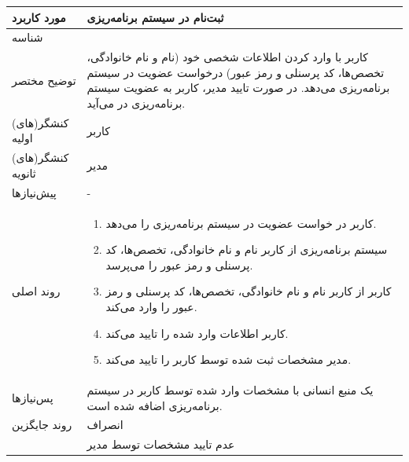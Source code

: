 \begin{table}[H]
	\centering
	\begin{tabular}{|p{3cm}|p{10cm}|}
		\hline
		مورد کاربرد & ثبت‌نام در سیستم برنامه‌ریزی  \\
		\hline
		شناسه & 
		\stepcounter{usecase_ID}
		\arabic{usecase_ID} \\
		\hline
		توضیح مختصر & کاربر با وارد کردن اطلاعات شخصی خود (نام و نام خانوادگی، تخصص‌ها، کد پرسنلی و رمز عبور) درخواست عضویت در سیستم برنامه‌ریزی می‌دهد. در صورت تایید مدیر، کاربر به عضویت سیستم برنامه‌ریزی در می‌آید. \\
		\hline
		کنشگر(های) اولیه & کاربر \\
		\hline
		کنشگر(های) ثانویه & مدیر \\
		\hline
		پیش‌نیازها & - \\
		\hline
		
		روند اصلی &
		\begin{enumerate}[topsep=0cm,leftmargin=0.5cm]
			\item کاربر در خواست عضویت در سیستم برنامه‌ریزی را می‌دهد.
			\item سیستم برنامه‌ریزی از کاربر نام و نام خانوادگی، تخصص‌ها، کد پرسنلی و رمز عبور را می‌پرسد.
			\item کاربر از کاربر نام و نام خانوادگی، تخصص‌ها، کد پرسنلی و رمز عبور را وارد می‌کند.
			\item کاربر اطلاعات وارد شده را تایید می‌کند.
			\item مدیر مشخصات ثبت شده توسط کاربر را تایید می‌کند.
		\end{enumerate} \\
		
		\hline
		پس‌نیازها & یک منبع انسانی با مشخصات وارد شده توسط کاربر در سیستم برنامه‌ریزی اضافه شده است. \\
		\hline
		روند جایگزین & انصراف \\
		& عدم تایید مشخصات توسط مدیر \\
		\hline
	\end{tabular}
\end{table}


